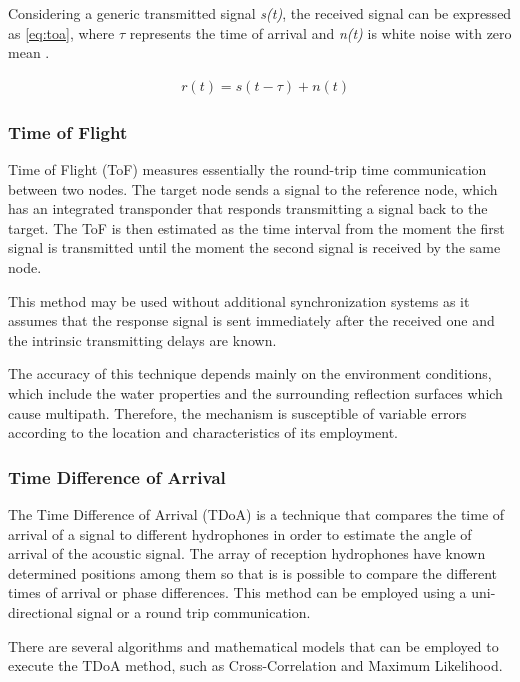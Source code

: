 Considering a generic transmitted signal \textit{s(t)}, the received signal can be expressed as \ref{eq:toa}, where $\tau$ represents the time of arrival and \textit{n(t)} is white noise with zero mean \cite{wirelesscomm}. 

\begin{eqnarray}
& r(t) = s(t - \tau) + n(t)
\label{eq:toa}
\end{eqnarray}

\subsubsection{Time of Flight}

Time of Flight (ToF) measures essentially the round-trip time communication between two nodes. The target node sends a signal to the reference node, which has an integrated transponder that responds transmitting a signal back to the target. The ToF is then estimated as the time interval from the moment the first signal is transmitted until the moment the second signal is received by the same node. 

This method may be used without additional synchronization systems as it assumes that the response signal is sent immediately after the received one and the intrinsic transmitting delays are known.

The accuracy of this technique depends mainly on the environment conditions, which include the water properties and the surrounding reflection surfaces which cause multipath. Therefore, the mechanism is susceptible of variable errors according to the location and characteristics of its employment.

\subsubsection{Time Difference of Arrival}

The Time Difference of Arrival (TDoA) is a technique that compares the time of arrival of a signal to different hydrophones in order to estimate the angle of arrival of the acoustic signal. The array of reception hydrophones have known determined positions among them so that is is possible to compare the different times of arrival or phase differences. This method can be employed using a uni-directional signal or a round trip communication.

There are several algorithms and mathematical models that can be employed to execute the TDoA method, such as Cross-Correlation and Maximum Likelihood.

